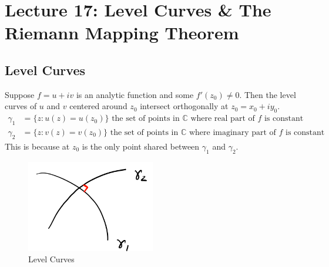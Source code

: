 \chapter{Lecture 17: Level Curves \& The Riemann Mapping Theorem}

\section{Level Curves}

\begin{claim}
    Suppose $f = u + iv$ is an analytic function and some $f'(z_0) \neq 0$. Then the level curves of $u$ and $v$ centered around $z_0$ intersect orthogonally at $z_0 = x_0 + iy_0$.
    \begin{align*}
        \gamma_1 & = \{z : u(z) = u(z_0)\} \text{ the set of points in } \mathbb{C} \text{ where real part of } f \text{ is constant}      \\
        \gamma_2 & = \{z : v(z) = v(z_0)\} \text{ the set of points in } \mathbb{C} \text{ where imaginary part of } f \text{ is constant}
    \end{align*}
    This is because at $z_0$ is the only point shared between $\gamma_1$ and $\gamma_2$.
    \begin{figure}[H]
        \centering
        \includegraphics[width=0.5\textwidth]{LECTURE_17/graph.png}
        \caption{Level Curves}
    \end{figure}
\end{claim}

